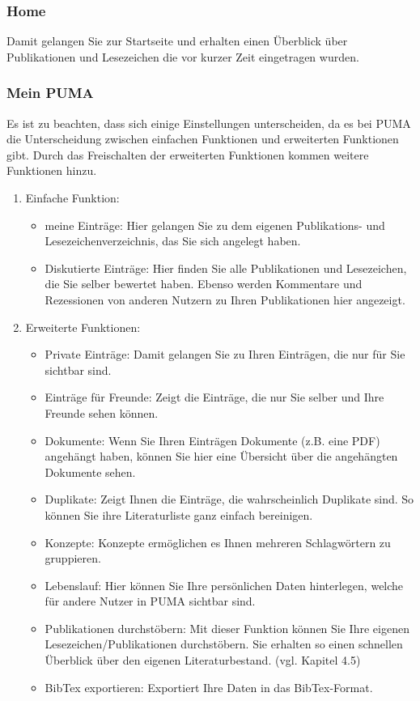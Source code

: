 \documentclass[b5paper,11pt,twoside]{scrbook} %
\begin{document}
\subsubsection{Home}
Damit gelangen Sie zur Startseite und erhalten einen Überblick über Publikationen und Lesezeichen die vor kurzer Zeit eingetragen wurden.
\subsubsection{Mein PUMA}
Es ist zu beachten, dass sich einige Einstellungen unterscheiden, da es bei PUMA die Unterscheidung zwischen einfachen Funktionen und erweiterten Funktionen gibt. Durch das Freischalten der erweiterten Funktionen kommen weitere Funktionen hinzu.
\begin{enumerate}
    \item Einfache Funktion:
    \begin{itemize}
        \item meine Einträge: Hier gelangen Sie zu dem eigenen Publikations- und Lesezeichenverzeichnis, das Sie sich angelegt haben.
        \item Diskutierte Einträge: Hier finden Sie alle Publikationen und Lesezeichen, die Sie selber bewertet haben. Ebenso werden Kommentare und Rezessionen von anderen Nutzern zu Ihren Publikationen hier angezeigt.
    \end{itemize}
    \item Erweiterte Funktionen:
    \begin{itemize}
        \item Private Einträge: Damit gelangen Sie zu Ihren Einträgen, die nur für Sie sichtbar sind. 
        \item Einträge für Freunde: Zeigt die Einträge, die nur Sie selber und Ihre Freunde sehen können.
        \item Dokumente: Wenn Sie Ihren Einträgen Dokumente (z.B. eine PDF) angehängt haben, können Sie hier eine Übersicht über die angehängten Dokumente sehen.
        \item Duplikate: Zeigt Ihnen die Einträge, die wahrscheinlich Duplikate sind. So können Sie ihre Literaturliste ganz einfach bereinigen. 
        \item Konzepte: Konzepte ermöglichen es Ihnen mehreren Schlagwörtern zu gruppieren. %
        \item Lebenslauf: Hier können Sie Ihre persönlichen Daten hinterlegen, welche für andere Nutzer in PUMA sichtbar sind.
        \item Publikationen durchstöbern: Mit dieser Funktion können Sie Ihre eigenen Lesezeichen/Publikationen durchstöbern. Sie erhalten so einen schnellen Überblick über den eigenen Literaturbestand. (vgl. Kapitel 4.5)
        \item BibTex exportieren: Exportiert Ihre Daten in das BibTex-Format.
    \end{itemize}
\end{enumerate}
\end{document}
